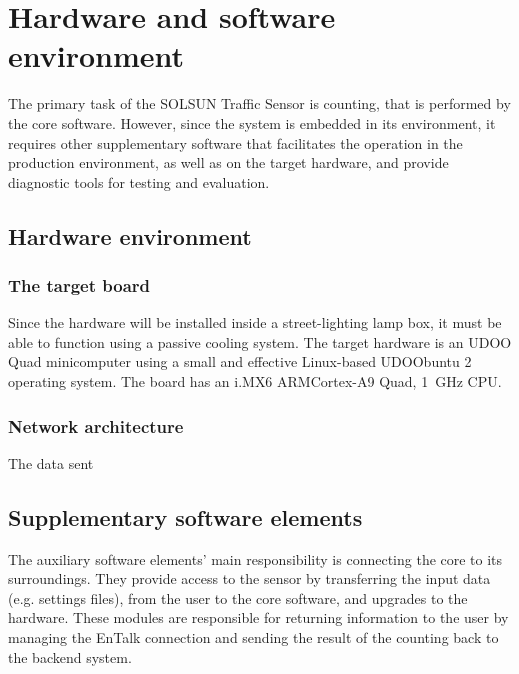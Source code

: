 \chapter{Hardware and software environment}\label{chap:Environment}
The primary task of the SOLSUN Traffic Sensor is counting, that is performed by the core software.
However, since the system is embedded in its environment, it requires other supplementary software that facilitates the operation in the production environment, as well as on the target hardware, and provide diagnostic tools for testing and evaluation.
\section{Hardware environment}
\subsection{The target board}
Since the hardware will be installed inside a street-lighting lamp box, it must be able to function using a passive cooling system.
The target hardware is an UDOO Quad minicomputer using a small and effective Linux-based UDOObuntu 2 operating system.
The board has an i.MX6 ARM\reg Cortex\reg-A9 Quad, \SI{1}{GHz} CPU.

\subsection{Network architecture}
The data sent


\section{Supplementary software elements}\label{sec:SupplementarySoftware}
The auxiliary software elements' main responsibility is connecting the core to its surroundings.
They provide access to the sensor by transferring the input data (e.g. settings files), from the user to the core software, and upgrades to the hardware.
These modules are responsible for returning information to the user by managing the EnTalk connection and sending the result of the counting back to the backend system.

